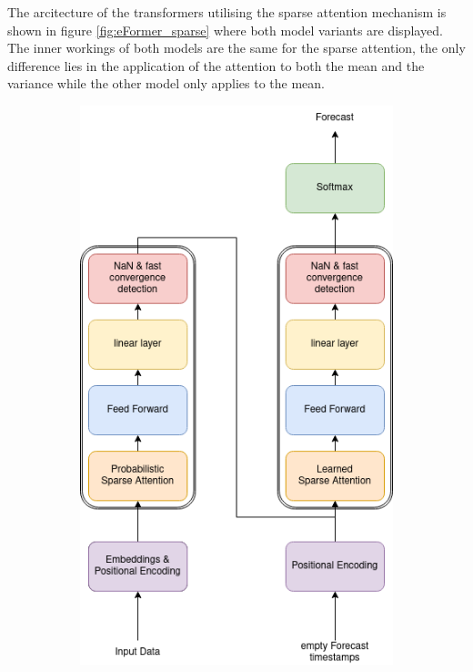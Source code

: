 \documentclass{article}
\begin{document}
The arcitecture of the transformers utilising the sparse attention mechanism is shown in figure \ref{fig:eFormer_sparse} where both model variants are displayed. The inner workings of both models are the same for the sparse attention, the only difference lies in the application of the attention to both the mean and the variance while the other model only applies to the mean.

\begin{figure}[!ht]
    \hspace*{\fill}
    \begin{subfigure}[b]{0.4\linewidth}
        \includegraphics[width=\linewidth]{graphs/eFormer_probSparse.png}

\end{subfigure}
\end{figure}
\end{document}

